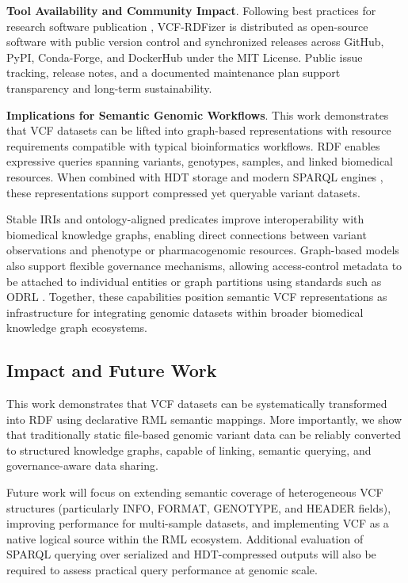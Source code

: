 \documentclass[unnumsec,webpdf,contemporary,large]{oup-authoring-template}
\begin{document}
\textbf{Tool Availability and Community Impact}.
Following best practices for research software publication \cite{jimenez_2017_f1000}, VCF-RDFizer is distributed as open-source software with public version control and synchronized releases across GitHub, PyPI, Conda-Forge, and DockerHub under the MIT License. 
Public issue tracking, release notes, and a documented maintenance plan support transparency and long-term sustainability.


\textbf{Implications for Semantic Genomic Workflows}.
This work demonstrates that VCF datasets can be lifted into graph-based representations with resource requirements compatible with typical bioinformatics workflows. 
RDF enables expressive queries spanning variants, genotypes, samples, and linked biomedical resources. 
When combined with HDT storage and modern SPARQL engines \cite{Taelman2018Comunica}, these representations support compressed yet queryable variant datasets.

Stable IRIs and ontology-aligned predicates improve interoperability with biomedical knowledge graphs, enabling direct connections between variant observations and phenotype or pharmacogenomic resources. 
Graph-based models also support flexible governance mechanisms, allowing access-control metadata to be attached to individual entities or graph partitions using standards such as ODRL \cite{odrl_2018}. 
Together, these capabilities position semantic VCF representations as infrastructure for integrating genomic datasets within broader biomedical knowledge graph ecosystems.

\subsection{Impact and Future Work}\label{subsec4.3}
This work demonstrates that VCF datasets can be systematically transformed into RDF using declarative RML semantic mappings. 
More importantly, we show that traditionally static file-based genomic variant data can be reliably converted to structured knowledge graphs, capable of linking, semantic querying, and governance-aware data sharing.

Future work will focus on extending semantic coverage of heterogeneous VCF structures (particularly INFO, FORMAT, GENOTYPE, and HEADER fields), improving performance for multi-sample datasets, and implementing VCF as a native logical source within the RML ecosystem. 
Additional evaluation of SPARQL querying over serialized and HDT-compressed outputs will also be required to assess practical query performance at genomic scale.
\end{document}
